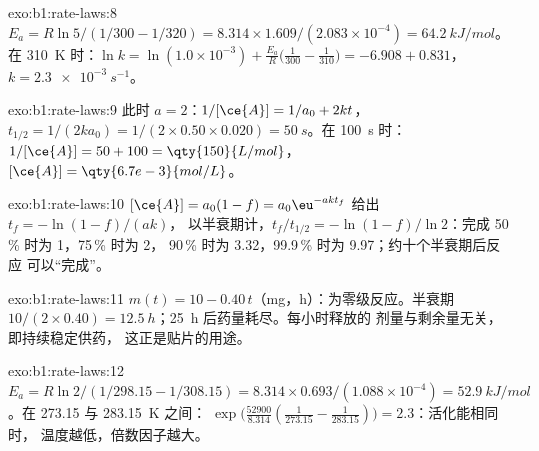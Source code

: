 \begin{solution}{exo:b1:rate-laws:8}
$E_a = R\ln5/(1/300 - 1/320) = 8.314 \times 1.609/(2.083 \times 10^{-4}) =
\qty{64.2}{kJ/mol}$。在 \qty{310}{K} 时：$\ln k = \ln(1.0 \times 10^{-3}) +
\frac{E_a}{R}\big(\frac{1}{300} - \frac{1}{310}\big) = -6.908 + 0.831$，
$k = \qty{2.3e-3}{s^{-1}}$。
\end{solution}

\begin{solution}{exo:b1:rate-laws:9}
此时 $a = 2$：$1/[\ce{A}] = 1/a_0 + 2kt$，$t_{1/2} = 1/(2k a_0) = 1/(2
\times 0.50 \times 0.020) = \qty{50}{s}$。在 \qty{100}{s} 时：$1/[\ce{A}] = 50
+ 100 = \qty{150}{L/mol}$，$[\ce{A}] = \qty{6.7e-3}{mol/L}$。
\end{solution}

\begin{solution}{exo:b1:rate-laws:10}
$[\ce{A}] = a_0(1 - f) = a_0\eu^{-akt_f}$ 给出 $t_f = -\ln(1-f)/(ak)$，
以半衰期计，$t_f/t_{1/2} = -\ln(1-f)/\ln2$：完成 50\,\% 时为 1，75\,\% 时为 2，
90\,\% 时为 3.32，99.9\,\% 时为 9.97；约十个半衰期后反应
可以“完成”。
\end{solution}

\begin{solution}{exo:b1:rate-laws:11}
$m(t) = 10 - 0.40\,t$（\unit{mg}，\unit{h}）：为零级反应。半衰期
$10/(2 \times 0.40) = \qty{12.5}{h}$；\qty{25}{h} 后药量耗尽。每小时释放的
剂量与剩余量无关，即持续稳定供药，
这正是贴片的用途。
\end{solution}

\begin{solution}{exo:b1:rate-laws:12}
$E_a = R\ln2/(1/298.15 - 1/308.15) = 8.314 \times 0.693/(1.088 \times
10^{-4}) = \qty{52.9}{kJ/mol}$。在 273.15 与 \qty{283.15}{K} 之间：
$\exp\big(\frac{52900}{8.314}(\frac{1}{273.15} - \frac{1}{283.15})\big) =
2.3$：活化能相同时，
温度越低，倍数因子越大。
\end{solution}

